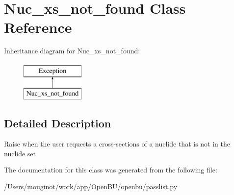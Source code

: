\hypertarget{classopenbu_1_1passlist_1_1_nuc__xs__not__found}{}\section{Nuc\+\_\+xs\+\_\+not\+\_\+found Class Reference}
\label{classopenbu_1_1passlist_1_1_nuc__xs__not__found}
Inheritance diagram for Nuc\+\_\+xs\+\_\+not\+\_\+found\+:\begin{figure}[H]
\begin{center}
\leavevmode
\includegraphics[height=2.000000cm]{classopenbu_1_1passlist_1_1_nuc__xs__not__found}
\end{center}
\end{figure}


\subsection{Detailed Description}
\begin{DoxyVerb}Raise when the user requests a cross-sections of a nuclide that is not in the nuclide set \end{DoxyVerb}
 

The documentation for this class was generated from the following file\+:\begin{DoxyCompactItemize}
\item 
/\+Users/mouginot/work/app/\+Open\+B\+U/openbu/passlist.\+py\end{DoxyCompactItemize}
